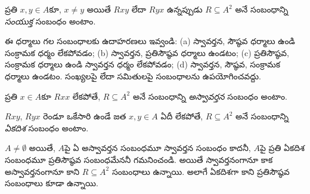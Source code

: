 \documentclass[../../../include/open-logic-section]{subfiles}
\begin{document}
\begin{defn}[సంయుక్తత్వం]
ప్రతి $x,y\in A$కూ, $x \neq y$ అయితే $Rxy$ లేదా $Ryx$
ఉన్నప్పుడు $R \subseteq A^2$ అనే సంబంధాన్ని \emph{సంయుక్త}
సంబంధం అంటాం.
\end{defn}

\begin{prob}
ఈ ధర్మాలు గల సంబంధాలకు ఉదాహరణలు ఇవ్వండి:
(a) స్వావర్తన, సౌష్ఠవ ధర్మాలు ఉండి సంక్రామక ధర్మం లేకపోవడం;
(b) స్వావర్తన, ప్రతిసౌష్ఠవ ధర్మాలు ఉండటం;
(c) ప్రతిసౌష్ఠవ, సంక్రామక ధర్మాలు ఉండి స్వావర్తన ధర్మం లేకపోవడం;
(d) స్వావర్తన, సౌష్ఠవ, సంక్రామక ధర్మాలు ఉండటం.
సంఖ్యలపై లేదా సమితులపై సంబంధాలను ఉపయోగించవద్దు.
\end{prob} 
 
\begin{defn}[అస్వావర్తనత్వం]
ప్రతి $x \in A$కూ $Rxx$ లేకపోతే,
$R \subseteq A^2$ అనే సంబంధాన్ని \emph{అస్వావర్తన} సంబంధం అంటాం.
\end{defn}

\begin{defn}[ఏకదిశత్వం]
$Rxy$, $Ryx$ రెండూ ఒకేసారి ఉండే జత $x,y\in A$ ఏదీ లేకపోతే,
$R \subseteq A^2$ అనే సంబంధాన్ని \emph{ఏకదిశ} సంబంధం అంటాం.
\end{defn}

$A \neq \emptyset$ అయితే, $A$పై ఏ అస్వావర్తన సంబంధమూ స్వావర్తన
సంబంధం కాదనీ, $A$పై ప్రతి ఏకదిశ సంబంధమూ ప్రతిసౌష్ఠవ సంబంధమేననీ
గమనించండి. అయితే స్వావర్తనంగానూ కాక అస్వావర్తనంగానూ కాని
$R \subseteq A^2$ సంబంధాలు ఉన్నాయి. అలాగే ఏకదిశగా కాని
ప్రతిసౌష్ఠవ సంబంధాలు కూడా ఉన్నాయి.
\end{document}
